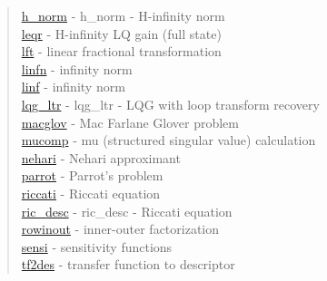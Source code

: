 \begin{quote}
\hyperlink{h_norm}{h\_norm} - {h_norm} - {H-infinity norm} \\  
\hyperlink{leqr}{leqr} - {H-infinity LQ gain (full state)  } \\  
\hyperlink{lft}{lft} - {linear fractional transformation} \\  
\hyperlink{linfn}{linfn} - {infinity norm} \\  
\hyperlink{linf}{linf} - {infinity norm} \\  
\hyperlink{lqg_ltr}{lqg\_ltr} - {lqg_ltr} - {LQG with loop transform recovery} \\  
\hyperlink{macglov}{macglov} - {Mac Farlane Glover problem} \\
\hyperlink{mucomp}{mucomp} - {mu (structured singular value) calculation} \\
\hyperlink{nehari}{nehari} - {Nehari approximant} \\  
\hyperlink{parrot}{parrot} - {Parrot's problem} \\  
\hyperlink{riccati}{riccati} - {Riccati equation} \\  
\hyperlink{ric_desc}{ric\_desc} - {ric_desc} - {Riccati equation} \\  
\hyperlink{rowinout}{rowinout} - {inner-outer factorization} \\  
\hyperlink{sensi}{sensi} - {sensitivity functions} \\  
\hyperlink{tf2des}{tf2des} - {transfer function to descriptor} \\  
\end{quote}








































 


